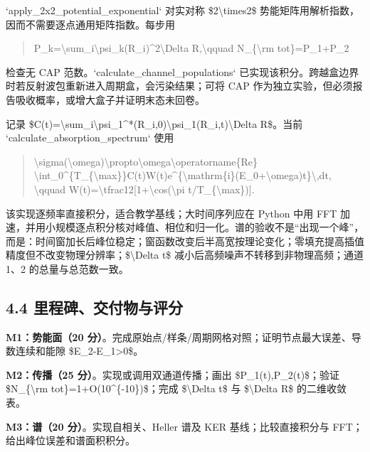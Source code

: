 \documentclass[UTF8,openany,11pt,fontset=fandol]{ctexbook}
\begin{document}
`apply\_2x2\_potential\_exponential` 对实对称 \$2\textbackslash times2\$
势能矩阵用解析指数，因而不需要逐点通用矩阵指数。每步用

\begin{quote}
P\_k=\textbackslash sum\_i\textbar\textbackslash psi\_k(R\_i)\textbar\^{}2\textbackslash Delta
R,\textbackslash qquad N\_\{\textbackslash rm tot\}=P\_1+P\_2
\end{quote}

检查无 CAP 范数。`calculate\_channel\_populations`
已实现该积分。跨越盒边界时若反射波包重新进入周期盒，会污染结果；可将 CAP
作为独立实验，但必须报告吸收概率，或增大盒子并证明末态未回卷。

记录
\$C(t)=\textbackslash sum\_i\textbackslash psi\_1\^{}*(R\_i,0)\textbackslash psi\_1(R\_i,t)\textbackslash Delta
R\$。当前 `calculate\_absorption\_spectrum` 使用

\begin{quote}
\textbackslash sigma(\textbackslash omega)\textbackslash propto\textbackslash omega\textbackslash operatorname\{Re\}
\textbackslash int\_0\^{}\{T\_\{\textbackslash max\}\}C(t)W(t)e\^{}\{\textbackslash mathrm\{i\}(E\_0+\textbackslash omega)t\}\textbackslash,dt,
\textbackslash qquad
W(t)=\textbackslash tfrac12{[}1+\textbackslash cos(\textbackslash pi
t/T\_\{\textbackslash max\}){]}.
\end{quote}

该实现逐频率直接积分，适合教学基线；大时间序列应在 Python 中用 FFT
加速，并用小规模逐点积分核对峰值、相位和归一化。谱的验收不是``出现一个峰''，而是：时间窗加长后峰位稳定；窗函数改变后半高宽按理论变化；零填充提高插值精度但不改变物理分辨率；\$\textbackslash Delta
t\$ 减小后高频噪声不转移到非物理高频；通道 1、2 的总量与总范数一致。

\subsection{\texorpdfstring{\textbf{4.4
里程碑、交付物与评分}}{4.4 里程碑、交付物与评分}}\label{ux91ccux7a0bux7891ux4ea4ux4ed8ux7269ux4e0eux8bc4ux5206}

\textbf{M1：势能面（20
分）}。完成原始点/样条/周期网格对照；证明节点最大误差、导数连续和能隙
\$E\_2-E\_1\textgreater0\$。

\textbf{M2：传播（25 分）}。实现或调用双通道传播；画出
\$P\_1(t),P\_2(t)\$；验证 \$N\_\{\textbackslash rm
tot\}=1+O(10\^{}\{-10\})\$；完成 \$\textbackslash Delta t\$ 与
\$\textbackslash Delta R\$ 的二维收敛表。

\textbf{M3：谱（20 分）}。实现自相关、Heller 谱及 KER
基线；比较直接积分与 FFT；给出峰位误差和谱面积积分。
\end{document}
